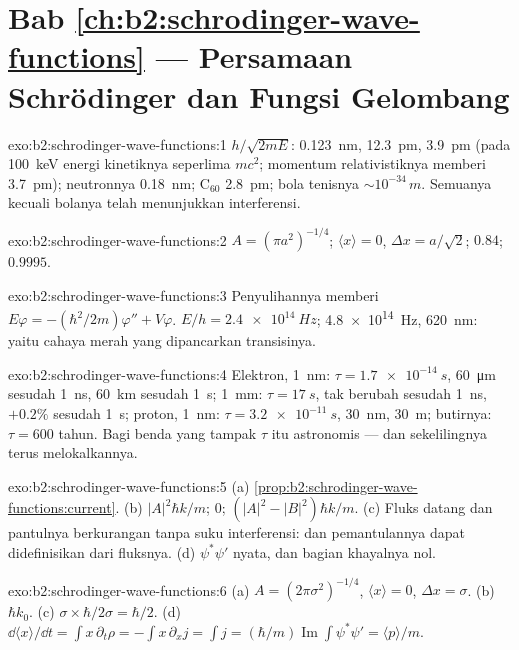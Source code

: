 \section*{Bab \ref{ch:b2:schrodinger-wave-functions} --- Persamaan Schrödinger dan Fungsi Gelombang}

\begin{solution}{exo:b2:schrodinger-wave-functions:1}
$h/\sqrt{2mE}$: \qty{0.123}{nm}, \qty{12.3}{pm}, \qty{3.9}{pm} (pada \qty{100}{keV}
energi kinetiknya seperlima $mc^2$; momentum relativistiknya memberi
\qty{3.7}{pm}); neutronnya \qty{0.18}{nm}; C$_{60}$ \qty{2.8}{pm}; bola tenisnya
$\sim 10^{-34}\,\unit{m}$. Semuanya kecuali bolanya telah menunjukkan interferensi.
\end{solution}

\begin{solution}{exo:b2:schrodinger-wave-functions:2}
$A = (\pi a^2)^{-1/4}$; $\langle x\rangle = 0$, $\Delta x = a/\sqrt2$; $0.84$; $0.9995$.
\end{solution}

\begin{solution}{exo:b2:schrodinger-wave-functions:3}
Penyulihannya memberi $E\varphi = -(\hbar^2/2m)\varphi'' + V\varphi$. $E/h =
\qty{2.4e14}{Hz}$; \qty{4.8e14}{Hz}, \qty{620}{nm}: yaitu cahaya merah yang dipancarkan
transisinya.
\end{solution}

\begin{solution}{exo:b2:schrodinger-wave-functions:4}
Elektron, \qty{1}{nm}: $\tau = \qty{1.7e-14}{s}$, \qty{60}{\micro m} sesudah \qty{1}{ns},
\qty{60}{km} sesudah \qty{1}{s}; \qty{1}{mm}: $\tau = \qty{17}{s}$, tak berubah sesudah \qty{1}{ns},
$+0.2\%$ sesudah \qty{1}{s}; proton, \qty{1}{nm}: $\tau = \qty{3.2e-11}{s}$, \qty{30}{nm},
\qty{30}{m}; butirnya: $\tau = 600$ tahun. Bagi benda yang tampak $\tau$ itu
astronomis --- dan sekelilingnya terus melokalkannya.
\end{solution}

\begin{solution}{exo:b2:schrodinger-wave-functions:5}
(a) \cref{prop:b2:schrodinger-wave-functions:current}. (b) $|A|^2\hbar k/m$;
$0$; $(|A|^2 - |B|^2)\hbar k/m$. (c) Fluks datang dan pantulnya
berkurangan tanpa suku interferensi:  dan pemantulannya
dapat didefinisikan dari fluksnya. (d) $\psi^*\psi'$ nyata, dan bagian
khayalnya nol.
\end{solution}

\begin{solution}{exo:b2:schrodinger-wave-functions:6}
(a) $A = (2\pi\sigma^2)^{-1/4}$, $\langle x\rangle = 0$, $\Delta x = \sigma$. (b) $\hbar k_0$.
(c) $\sigma \times \hbar/2\sigma = \hbar/2$. (d) $\dd\langle x\rangle/\dd t = \int x\,
\partial_t\rho = -\int x\,\partial_xj = \int j = (\hbar/m)\operatorname{Im}\int\psi^*
\psi' = \langle p\rangle/m$.
\end{solution}

